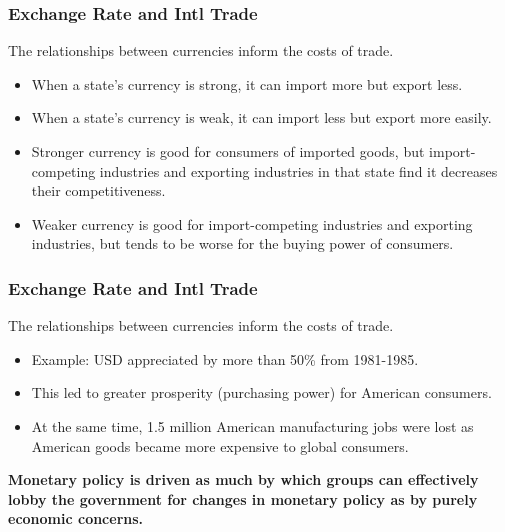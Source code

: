 \documentclass{beamer}
\begin{document}
\begin{frame} 
	\frametitle{\LARGE{Exchange Rate and Intl Trade}}
The relationships between currencies inform the costs of trade. \pause
	\begin{itemize}
		\item When a state's currency is strong, it can import more but export less. \pause
		\item When a state's currency is weak, it can import less but export more easily.
		\item Stronger currency is good for consumers of imported goods, but import-competing industries and exporting industries in that state find it decreases their competitiveness. \pause
		\item Weaker currency is good for import-competing industries and exporting industries, but tends to be worse for the buying power of consumers. 
	\end{itemize}

\end{frame}

\begin{frame} 
	\frametitle{\LARGE{Exchange Rate and Intl Trade}}
	The relationships between currencies inform the costs of trade. \pause
	\begin{itemize}
		\item Example: USD appreciated by more than 50\% from 1981-1985.
		\item This led to greater prosperity (purchasing power) for American consumers. 
		\item At the same time, 1.5 million American manufacturing jobs were lost as American goods became more expensive to global consumers. \pause 
	\end{itemize}
	\textbf{Monetary policy is driven as much by which groups can effectively lobby the government for changes in monetary policy as by purely economic concerns.}	
\end{frame}
\end{document}
